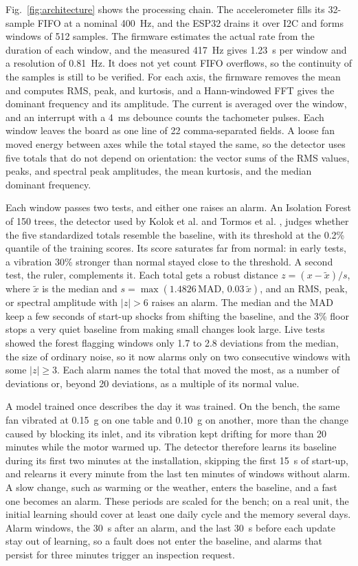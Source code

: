 \documentclass[english,hidelinks]{sbrt}
\begin{document}
Fig.~\ref{fig:architecture} shows the processing chain. The accelerometer fills its 32-sample FIFO at a nominal 400~Hz, and the ESP32 drains it over I2C and forms windows of 512 samples. The firmware estimates the actual rate from the duration of each window, and the measured 417~Hz gives 1.23~s per window and a resolution of 0.81~Hz. It does not yet count FIFO overflows, so the continuity of the samples is still to be verified. For each axis, the firmware removes the mean and computes RMS, peak, and kurtosis, and a Hann-windowed FFT gives the dominant frequency and its amplitude. The current is averaged over the window, and an interrupt with a 4~ms debounce counts the tachometer pulses. Each window leaves the board as one line of 22 comma-separated fields. A loose fan moved energy between axes while the total stayed the same, so the detector uses five totals that do not depend on orientation: the vector sums of the RMS values, peaks, and spectral peak amplitudes, the mean kurtosis, and the median dominant frequency.

Each window passes two tests, and either one raises an alarm. An Isolation Forest of 150 trees, the detector used by Kolok et al. and Tormos et al. \cite{kolok2025lowcost,tormos2026hvacxai}, judges whether the five standardized totals resemble the baseline, with its threshold at the 0.2\% quantile of the training scores. Its score saturates far from normal: in early tests, a vibration 30\% stronger than normal stayed close to the threshold. A second test, the ruler, complements it. Each total gets a robust distance $z=(x-\tilde{x})/s$, where $\tilde{x}$ is the median and $s=\max(1.4826\,\mathrm{MAD},\,0.03\,\tilde{x})$, and an RMS, peak, or spectral amplitude with $|z|>6$ raises an alarm. The median and the MAD keep a few seconds of start-up shocks from shifting the baseline, and the 3\% floor stops a very quiet baseline from making small changes look large. Live tests showed the forest flagging windows only 1.7 to 2.8 deviations from the median, the size of ordinary noise, so it now alarms only on two consecutive windows with some $|z|\geq 3$. Each alarm names the total that moved the most, as a number of deviations or, beyond 20 deviations, as a multiple of its normal value.

A model trained once describes the day it was trained. On the bench, the same fan vibrated at 0.15~g on one table and 0.10~g on another, more than the change caused by blocking its inlet, and its vibration kept drifting for more than 20 minutes while the motor warmed up. The detector therefore learns its baseline during its first two minutes at the installation, skipping the first 15~s of start-up, and relearns it every minute from the last ten minutes of windows without alarm. A slow change, such as warming or the weather, enters the baseline, and a fast one becomes an alarm. These periods are scaled for the bench; on a real unit, the initial learning should cover at least one daily cycle and the memory several days. Alarm windows, the 30~s after an alarm, and the last 30~s before each update stay out of learning, so a fault does not enter the baseline, and alarms that persist for three minutes trigger an inspection request.
\end{document}
